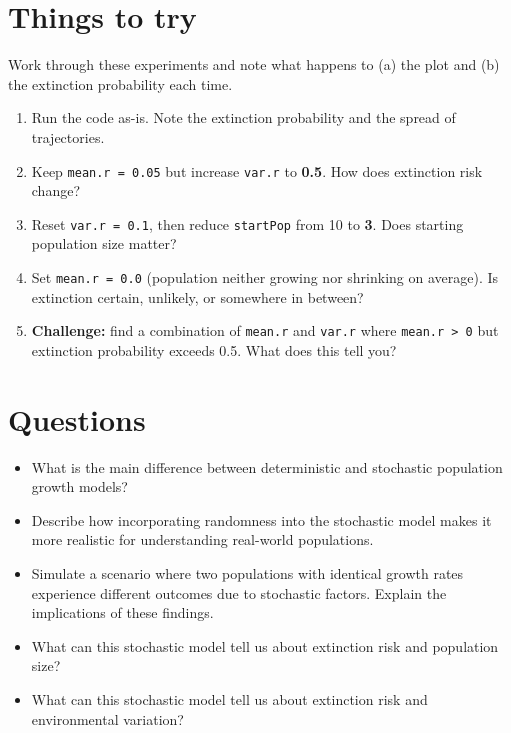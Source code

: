 \documentclass[
  a4paper]{book}
\providecommand{\tightlist}{%
  \setlength{\itemsep}{0pt}\setlength{\parskip}{0pt}}
\begin{document}
\section{Things to try}\label{things-to-try}

Work through these experiments and note what happens to (a) the plot and (b) the extinction probability each time.

\begin{enumerate}
\def\labelenumi{\arabic{enumi}.}
\tightlist
\item
  Run the code as-is. Note the extinction probability and the spread of trajectories.
\item
  Keep \texttt{mean.r\ =\ 0.05} but increase \texttt{var.r} to \textbf{0.5}. How does extinction risk change?
\item
  Reset \texttt{var.r\ =\ 0.1}, then reduce \texttt{startPop} from 10 to \textbf{3}. Does starting population size matter?
\item
  Set \texttt{mean.r\ =\ 0.0} (population neither growing nor shrinking on average). Is extinction certain, unlikely, or somewhere in between?
\item
  \textbf{Challenge:} find a combination of \texttt{mean.r} and \texttt{var.r} where \texttt{mean.r\ \textgreater{}\ 0} but extinction probability exceeds 0.5. What does this tell you?
\end{enumerate}

\section{Questions}\label{questions-4}

\begin{itemize}
\tightlist
\item
  What is the main difference between deterministic and stochastic population growth models?
\item
  Describe how incorporating randomness into the stochastic model makes it more realistic for understanding real-world populations.
\item
  Simulate a scenario where two populations with identical growth rates experience different outcomes due to stochastic factors. Explain the implications of these findings.
\item
  What can this stochastic model tell us about extinction risk and population size?
\item
  What can this stochastic model tell us about extinction risk and environmental variation?
\end{itemize}
\end{document}
